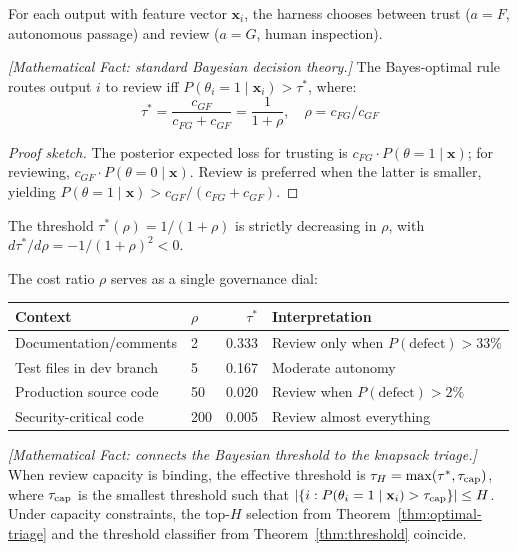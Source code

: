 For each output with feature vector $\mathbf{x}_i$, the harness chooses between trust ($a = F$, autonomous passage) and review ($a = G$, human inspection).

\begin{theorem}
\emph{[Mathematical Fact: standard Bayesian decision theory.]}
\label{thm:threshold}
The Bayes-optimal rule routes output $i$ to review iff $P(\theta_i = 1 \mid \mathbf{x}_i) > \tau^*$, where:
\begin{equation}
\tau^* = \frac{c_{GF}}{c_{FG} + c_{GF}} = \frac{1}{1 + \rho}, \quad \rho = c_{FG}/c_{GF}
\end{equation}
\end{theorem}

\begin{proof}[Proof sketch]
The posterior expected loss for trusting is $c_{FG} \cdot P(\theta = 1 \mid \mathbf{x})$; for reviewing, $c_{GF} \cdot P(\theta = 0 \mid \mathbf{x})$. Review is preferred when the latter is smaller, yielding $P(\theta = 1 \mid \mathbf{x}) > c_{GF}/(c_{FG} + c_{GF})$.
\end{proof}

\begin{theorem}[Monotonicity]
\label{thm:monotonicity}
The threshold $\tau^*(\rho) = 1/(1+\rho)$ is strictly decreasing in $\rho$, with $d\tau^*/d\rho = -1/(1+\rho)^2 < 0$.
\end{theorem}

The cost ratio $\rho$ serves as a single governance dial:

\begin{center}
\small
\begin{tabular}{llrl}
\toprule
\textbf{Context} & $\rho$ & $\tau^*$ & \textbf{Interpretation} \\
\midrule
Documentation/comments & 2 & 0.333 & Review only when $P(\text{defect}) > 33\%$ \\
Test files in dev branch & 5 & 0.167 & Moderate autonomy \\
Production source code & 50 & 0.020 & Review when $P(\text{defect}) > 2\%$ \\
Security-critical code & 200 & 0.005 & Review almost everything \\
\bottomrule
\end{tabular}
\end{center}

\begin{theorem}
\emph{[Mathematical Fact: connects the Bayesian threshold to the knapsack triage.]}
\label{thm:capacity-threshold}
When review capacity is binding, the effective threshold is $\tau_H = \max(\tau^*, \tau_{\textup{cap}})$, where $\tau_{\textup{cap}}$ is the smallest threshold such that $|\{i : P(\theta_i = 1 \mid \mathbf{x}_i) > \tau_{\textup{cap}}\}| \leq H$. Under capacity constraints, the top-$H$ selection from Theorem~\ref{thm:optimal-triage} and the threshold classifier from Theorem~\ref{thm:threshold} coincide.
\end{theorem}

